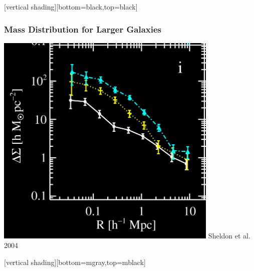 \documentclass{beamer}
\begin{document}
{
    [vertical shading][bottom=black,top=black]


    \frame
    {
        \frametitle{Mass Distribution for Larger Galaxies}

                \begin{center}
                    \includegraphics[trim=0 0 5 9,clip,width=0.8\textwidth]{deltasig_all_allband_bylum_icolor_crop.png}
                    \newline
                    {\color{gold}Sheldon et al. 2004}
                \end{center}
    }

    [vertical shading][bottom=mgray,top=mblack]
}
\end{document}
